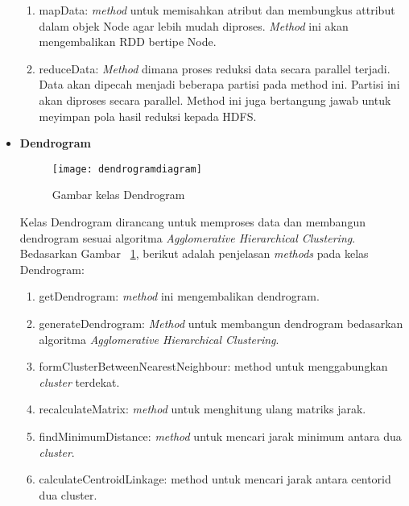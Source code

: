 \begin{itemize}
\begin{enumerate}
\item mapData: \textit{method} untuk memisahkan atribut dan membungkus attribut dalam objek Node agar lebih mudah diproses. \textit{Method} ini akan mengembalikan RDD bertipe Node.  

\item  reduceData: \textit{Method} dimana proses reduksi data secara parallel terjadi. Data akan dipecah menjadi beberapa partisi pada method ini. Partisi ini akan diproses secara parallel. Method ini juga bertangung jawab untuk meyimpan pola hasil reduksi kepada HDFS.\\

\end{enumerate}


\item \textbf{Dendrogram}\\

\begin{figure}[H]
    \centering  
    \texttt{[image: dendrogramdiagram]}  
    \caption[Gambar kelas Dendrogram]{Gambar kelas Dendrogram} 
    \label{fig:dendrogramdiagram} 
\end{figure}

Kelas Dendrogram dirancang untuk memproses data dan membangun dendrogram sesuai algoritma \textit{Agglomerative Hierarchical Clustering}. Bedasarkan Gambar ~\ref{fig:dendrogramdiagram}, berikut adalah penjelasan \textit{methods} pada kelas Dendrogram:

\begin{enumerate}
\item getDendrogram: \textit{method} ini mengembalikan dendrogram.

\item generateDendrogram: \textit{Method} untuk membangun dendrogram bedasarkan algoritma \textit{Agglomerative Hierarchical Clustering}. 

\item formClusterBetweenNearestNeighbour: method untuk menggabungkan \textit{cluster} terdekat.

\item recalculateMatrix: \textit{method} untuk menghitung ulang matriks jarak.

\item findMinimumDistance: \textit{method} untuk mencari jarak minimum antara dua \textit{cluster}.

\item calculateCentroidLinkage: method untuk mencari jarak antara centorid dua cluster.


\end{enumerate}
\end{itemize}
